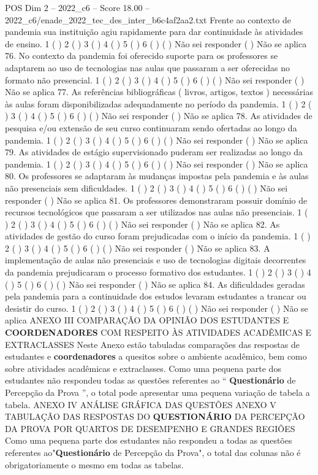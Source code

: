 \begin{textsample}{POS Dim 2 – 2022\_c6 – Score 18.00 – 2022\_c6/enade\_2022\_tec\_des\_inter\_b6c4af2aa2.txt}
Frente ao contexto de pandemia sua instituição agiu rapidamente para dar continuidade às atividades de ensino. 1 ( ) 2 ( ) 3 ( ) 4 ( ) 5 ( ) 6 ( ) ( ) Não sei responder ( ) Não se aplica 76.
No contexto da pandemia foi oferecido suporte para os professores se adaptarem ao uso de tecnologias nas aulas que passaram a ser oferecidas no formato não presencial. 1 ( ) 2 ( ) 3 ( ) 4 ( ) 5 ( ) 6 ( ) ( ) Não sei responder ( ) Não se aplica 77.
As referências bibliográficas ( livros, artigos, textos ) necessárias às aulas foram disponibilizadas adequadamente no período da pandemia. 1 ( ) 2 ( ) 3 ( ) 4 ( ) 5 ( ) 6 ( ) ( ) Não sei responder ( ) Não se aplica 78.
As atividades de pesquisa e/ou extensão de seu curso continuaram sendo ofertadas ao longo da pandemia. 1 ( ) 2 ( ) 3 ( ) 4 ( ) 5 ( ) 6 ( ) ( ) Não sei responder ( ) Não se aplica 79.
As atividades de estágio supervisionado puderam ser realizadas ao longo da pandemia. 1 ( ) 2 ( ) 3 ( ) 4 ( ) 5 ( ) 6 ( ) ( ) Não sei responder ( ) Não se aplica 80.
Os professores se adaptaram às mudanças impostas pela pandemia e às aulas não presenciais sem dificuldades. 1 ( ) 2 ( ) 3 ( ) 4 ( ) 5 ( ) 6 ( ) ( ) Não sei responder ( ) Não se aplica 81.
Os professores demonstraram possuir domínio de recursos tecnológicos que passaram a ser utilizados nas aulas não presenciais. 1 ( ) 2 ( ) 3 ( ) 4 ( ) 5 ( ) 6 ( ) ( ) Não sei responder ( ) Não se aplica 82.
As atividades de gestão do curso foram prejudicadas com o início da pandemia. 1 ( ) 2 ( ) 3 ( ) 4 ( ) 5 ( ) 6 ( ) ( ) Não sei responder ( ) Não se aplica 83.
A implementação de aulas não presenciais e uso de tecnologias digitais decorrentes da pandemia prejudicaram o processo formativo dos estudantes. 1 ( ) 2 ( ) 3 ( ) 4 ( ) 5 ( ) 6 ( ) ( ) Não sei responder ( ) Não se aplica 84.
As dificuldades geradas pela pandemia para a continuidade dos estudos levaram estudantes a trancar ou desistir do curso. 1 ( ) 2 ( ) 3 ( ) 4 ( ) 5 ( ) 6 ( ) ( ) Não sei responder ( ) Não se aplica ANEXO III COMPARAÇÃO DA OPINIÃO DOS ESTUDANTES E \textbf{COORDENADORES} COM RESPEITO ÀS ATIVIDADES ACADÊMICAS E EXTRACLASSES Neste Anexo estão tabuladas comparações das respostas de estudantes e \textbf{coordenadores} a quesitos sobre o ambiente acadêmico, bem como sobre atividades acadêmicas e extraclasses.
Como uma pequena parte dos estudantes não respondeu todas as questões referentes ao “ \textbf{Questionário} de Percepção da Prova ”, o total pode apresentar uma pequena variação de tabela a tabela.
ANEXO IV ANÁLISE GRÁFICA DAS QUESTÕES ANEXO V TABULAÇÃO DAS RESPOSTAS DO \textbf{QUESTIONÁRIO} DA PERCEPÇÃO DA PROVA POR QUARTOS DE DESEMPENHO E GRANDES REGIÕES Como uma pequena parte dos estudantes não respondeu a todas as questões referentes ao"\textbf{Questionário} de Percepção da Prova", o total das colunas não é obrigatoriamente o mesmo em todas as tabelas.

\end{textsample}
